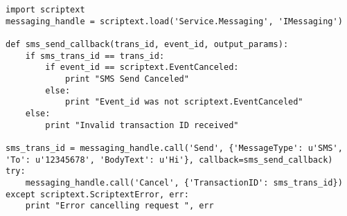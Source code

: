 \begin{verbatim}
import scriptext
messaging_handle = scriptext.load('Service.Messaging', 'IMessaging')

def sms_send_callback(trans_id, event_id, output_params):
    if sms_trans_id == trans_id:
        if event_id == scriptext.EventCanceled:
            print "SMS Send Canceled"
        else:
            print "Event_id was not scriptext.EventCanceled"
    else:
        print "Invalid transaction ID received"

sms_trans_id = messaging_handle.call('Send', {'MessageType': u'SMS', 'To': u'12345678', 'BodyText': u'Hi'}, callback=sms_send_callback)
try:
    messaging_handle.call('Cancel', {'TransactionID': sms_trans_id})
except scriptext.ScriptextError, err:
    print "Error cancelling request ", err
\end{verbatim}









































































